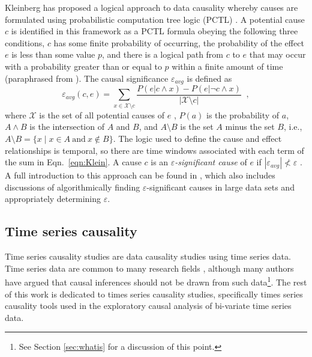 Kleinberg has proposed a logical approach to data causality whereby causes are formulated using probabilistic computation tree logic (PCTL) \cite{Kleinberg2009,Kleinberg2011,Kleinberg2012}.  A potential cause $c$ is identified in this framework as a PCTL formula obeying the following three conditions, $c$ has some finite probability of occurring, the probability of the effect $e$ is less than some value $p$, and there is a logical path from $c$ to $e$ that may occur with a probability greater than or equal to $p$ within a finite amount of time (paraphrased from \cite{Kleinberg2011}).  The causal significance $\varepsilon_{avg}$ is defined as
\begin{equation}
\label{eqn:Klein}
\varepsilon_{avg}(c,e) = \sum_{x\in \mathcal{X}\setminus c} \frac{P(e|c\wedge x) - P(e|\neg c\wedge x)}{|\mathcal{X}\setminus c|}\;\;,
\end{equation}
where $\mathcal{X}$ is the set of all potential causes of $e$ \cite{Kleinberg2011,Kleinberg2009}, $P(a)$ is the probability of $a$, $A\wedge B$ is the intersection of $A$ and $B$, and $A\setminus B$ is the set $A$ minus the set $B$, i.e., $A\setminus B = \{x\;|\;x\in A\mathrm{\ and\ }x\not\in B\}$.  The logic used to define the cause and effect relationships is temporal, so there are time windows associated with each term of the sum in Eqn.\ \ref{eqn:Klein}.  A cause $c$ is an {\em $\varepsilon$-significant cause} of $e$ if $|\varepsilon_{avg}|\nless\varepsilon$ \cite{Kleinberg2011}.  A full introduction to this approach can be found in \cite{Kleinberg2012}, which also includes discussions of algorithmically finding $\varepsilon$-significant causes in large data sets and appropriately determining $\varepsilon$.  

\subsection{Time series causality} 
Time series causality studies are data causality studies using time series data.  Time series data are common to many research fields \cite{ITbook_placeholder,Box2013}, although many authors have argued that causal inferences should not be drawn from such data\footnote{See Section \ref{sec:whatis} for a discussion of this point.}.  The rest of this work is dedicated to times series causality studies, specifically times series causality tools used in the exploratory causal analysis of bi-variate time series data.  


